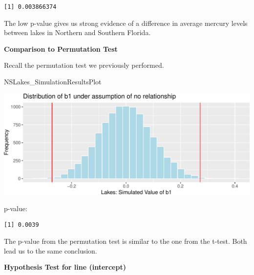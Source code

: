 \documentclass[
  letterpaper,
  DIV=11,
  numbers=noendperiod]{scrreprt}
\newenvironment{Shaded}{\begin{snugshade}}{\end{snugshade}}
\newcommand{\DecValTok}[1]{\textcolor[rgb]{0.68,0.00,0.00}{#1}}
\newcommand{\DocumentationTok}[1]{\textcolor[rgb]{0.37,0.37,0.37}{\textit{#1}}}
\newcommand{\FunctionTok}[1]{\textcolor[rgb]{0.28,0.35,0.67}{#1}}
\newcommand{\NormalTok}[1]{\textcolor[rgb]{0.00,0.23,0.31}{#1}}
\newcommand{\OtherTok}[1]{\textcolor[rgb]{0.00,0.23,0.31}{#1}}
\newcommand{\SpecialCharTok}[1]{\textcolor[rgb]{0.37,0.37,0.37}{#1}}
\begin{document}
\begin{verbatim}
[1] 0.003866374
\end{verbatim}

The low p-value gives us strong evidence of a difference in average
mercury levels between lakes in Northern and Southern Florida.

\textbf{Comparison to Permutation Test}

Recall the permutation test we previously performed.

\begin{Shaded}
\begin{Highlighting}[]
\NormalTok{NSLakes\_SimulationResultsPlot}
\end{Highlighting}
\end{Shaded}

\includegraphics{Ch4_files/figure-pdf/unnamed-chunk-40-1.pdf}

p-value:

\begin{Shaded}
\end{Shaded}

\begin{verbatim}
[1] 0.0039
\end{verbatim}

The p-value from the permutation test is similar to the one from the
t-test. Both lead us to the same conclusion.

\textbf{Hypothesis Test for line (intercept)}
\end{document}
